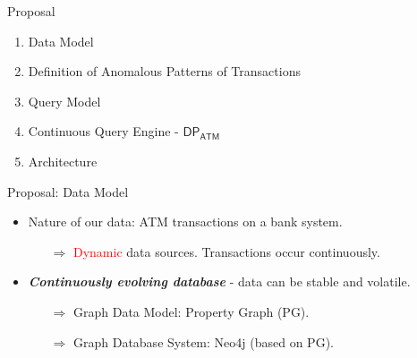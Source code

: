 
\begin{frame}{Proposal}

\begin{enumerate}
    \item Data Model
    \vspace{1em}
    \item Definition of Anomalous Patterns of Transactions
    \vspace{1em}
    \item Query Model
    \vspace{1em}
    \item Continuous Query Engine - $\mathsf{DP_{ATM}}$
    \vspace{1em}
    \item Architecture
\end{enumerate}
\end{frame}

\begin{frame}{Proposal: Data Model}

\begin{itemize}
\item Nature of our data: ATM transactions on a bank system.
\begin{itemize}
    \vspace{0.5em}
    \item[$\Rightarrow$] \textcolor{red}{Dynamic} data sources. Transactions occur continuously.
\end{itemize}
\vspace{2em}
\pause
\item \textbf{\emph{Continuously evolving database}} - data can be stable and volatile.
\begin{itemize}
    \vspace{0.5em}
    \item[$\Rightarrow$] Graph Data Model: Property Graph (PG).
    \vspace{1em}
    \item[$\Rightarrow$] Graph Database System: Neo4j (based on PG).
\end{itemize}
\end{itemize}
\end{frame}

